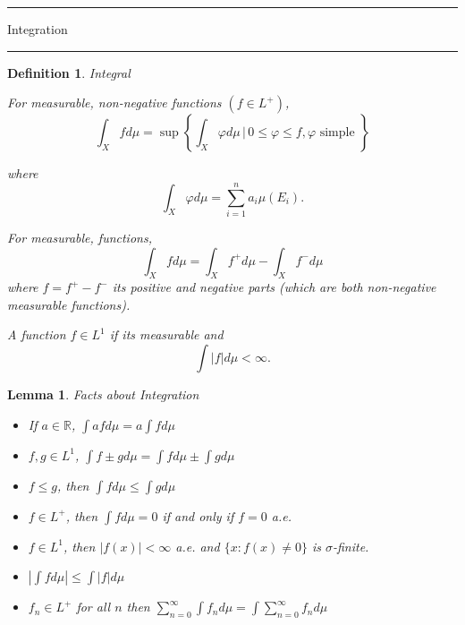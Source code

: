 \documentclass[12pt]{Qual}
\newtheorem{definition}{Definition}
\newtheorem{lemma}{Lemma}
\begin{document}
\begin{center}
\noindent\textcolor{blue!60!black}{\rule{15cm}{1mm}}
\Huge \faBug\faPuzzlePiece\faCoffee Integration \faCoffee\faPuzzlePiece\faBug
\vspace{-0.5cm}
\noindent\textcolor{blue!60!black}{\rule{15cm}{1mm}}
\end{center}
\vspace{0.25cm}
\begin{definition}{\Large\textit{Integral}}
$\,$

For measurable, non-negative functions $(f\in L^+)$, $$\int_Xfd\mu=\sup\left\{\int_X\varphi d\mu\,|\,0\le\varphi\le f,\varphi\text{ simple }\right\}$$

where $$\int_X\varphi d\mu=\sum_{i=1}^na_i\mu(E_i).$$

For measurable, functions, $$\int_Xfd\mu=\int_Xf^+d\mu-\int_Xf^-d\mu$$ where $f=f^+-f^-$ its positive and negative parts (which are both non-negative measurable functions).

A function $f\in L^1$ if its measurable and $$\int|f|d\mu<\infty.$$

\end{definition}
\vspace{0.5cm}
\begin{lemma}{\Large\textit{Facts about Integration}}

\begin{itemize}
\setlength\itemsep{-0.1em}
\renewcommand\labelitemi{\faCoffee}
    \item If $a\in\mathbb{R}$, $\displaystyle\int afd\mu=a\int fd\mu$
    \item $f,g\in L^1$, $\displaystyle\int f\pm gd\mu=\int fd\mu\pm\int gd\mu$
    \item $f\le g$, then $\displaystyle\int fd\mu\le\int gd\mu$
    \item $f\in L^+$, then $\displaystyle\int fd\mu=0$ if and only if $f=0$ a.e.
    \item $f\in L^1$, then $|f(x)|<\infty$ a.e. and $\{x:f(x)\not=0\}$ is $\sigma$-finite.
    \item $|\int fd\mu|\le\int|f|d\mu$
    \item $f_n\in L^+$ for all $n$ then $\displaystyle\sum_{n=0}^\infty\int f_nd\mu=\int \sum_{n=0}^\infty f_nd\mu$
\end{itemize}

\end{lemma}
\vspace{0.5cm}
\end{document}

